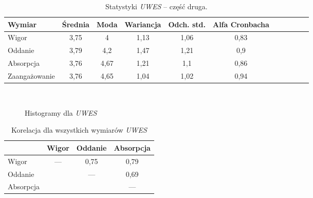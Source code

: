 \begin{table}[h!]
\begin{center}
\begin{tabular}{l | c c c c c c c c c c}
Wymiar & Średnia & Moda & Wariancja & Odch. std. & Alfa Cronbacha\\ \hline \hline
Wigor & 3,75 & 4 & 1,13 & 1,06 & 0,83 \\
Oddanie & 3,79 & 4,2 & 1,47 & 1,21 & 0,9 \\
Absorpcja & 3,76 & 4,67 & 1,21 & 1,1 & 0,86 \\ \hline
Zaangażowanie & 3,76 & 4,65 & 1,04 & 1,02 & 0,94 \\
\end{tabular}
\end{center}
\caption{Statystyki \emph{UWES} -- część druga.}
\label{tab:uwes-stats-2}
\end{table}

\begin{figure}[h]
    \centering
    \\
    \caption{Histogramy dla \emph{UWES}}
\end{figure}

\begin{table}[h!]
\begin{center}
\begin{tabular}{l | c c c }
 & Wigor & Oddanie & Absorpcja \\ \hline \hline
Wigor & --- & 0,75 & 0,79 \\
Oddanie & & --- & 0,69 \\
Absorpcja & & & --- \\
\end{tabular}
\end{center}
\caption{Korelacja dla wszystkich wymiarów \emph{UWES}}
\label{tab:uwes-correl}
\end{table}

